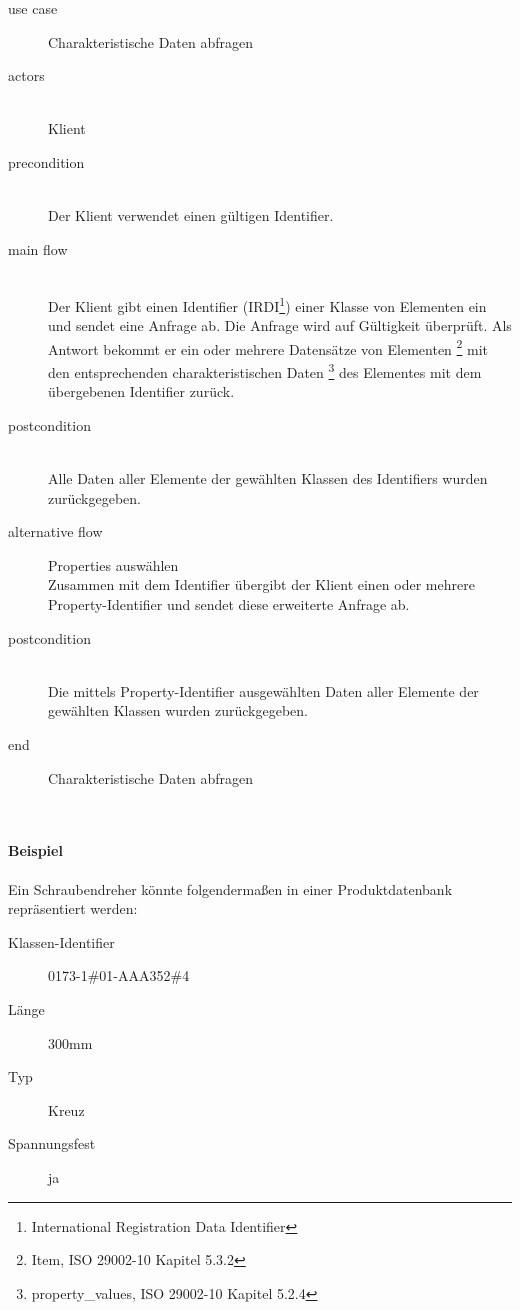 {\small

\begin{description}
     \item[use case] Charakteristische Daten abfragen
     \item[  actors]~\\
     Klient
     \item[  precondition]~\\
     Der Klient verwendet einen gültigen Identifier.
     \item[  main flow]~\\
     Der Klient gibt einen Identifier (IRDI\footnote{International Registration Data Identifier}) einer Klasse von Elementen ein und sendet eine Anfrage ab. Die Anfrage wird auf Gültigkeit überprüft. Als Antwort bekommt er ein oder mehrere Datensätze von Elementen \footnote{Item, ISO 29002-10 Kapitel 5.3.2} mit den entsprechenden charakteristischen Daten \footnote{property\_values, ISO 29002-10 Kapitel 5.2.4}  des Elementes mit dem übergebenen Identifier zurück.
     \item[  postcondition]~\\
     Alle Daten aller Elemente der gewählten Klassen des Identifiers wurden zurückgegeben.    
     \item[  alternative flow] Properties auswählen ~\\
     Zusammen mit dem Identifier übergibt der Klient einen oder mehrere Property-Identifier und sendet diese erweiterte Anfrage ab.    
     \item[  postcondition]~\\
     Die mittels Property-Identifier ausgewählten Daten aller Elemente der gewählten Klassen wurden zurückgegeben.    
     \item[end] Charakteristische Daten abfragen
\end{description}

~\\

} %

\paragraph{Beispiel}\label{lab:schraubendreher}

Ein Schraubendreher könnte folgendermaßen in einer Produktdatenbank repräsentiert werden:

\begin{description}
\item[Klassen-Identifier] 0173-1\#01-AAA352\#4 
\item[Länge] 300mm
\item[Typ] Kreuz
\item[Spannungsfest] ja
\end{description}

